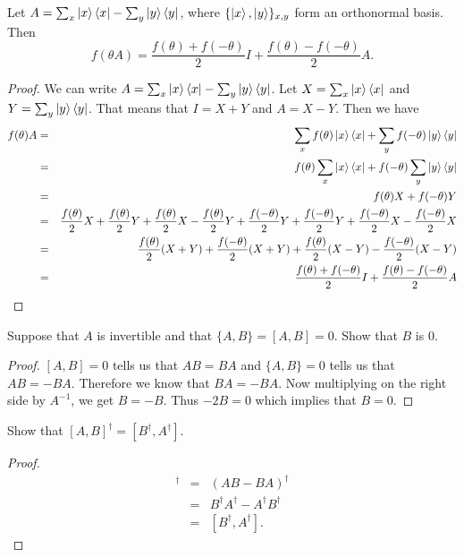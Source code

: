 \documentclass{article}
\begin{document}
\begin{lemma}
  Let $A=\sum_x\ket{x}\bra{x}-\sum_y\ket{y}\bra{y}$, where $\{\ket{x},\ket{y}\}_{x,y}$ form an orthonormal basis.
  Then
  \[
    f(\theta A) = \frac{f(\theta)+f(-\theta)}{2}I + \frac{f(\theta)-f(-\theta)}{2}A.
  \]
  \begin{proof}
    We can write $A=\sum_x\ket{x}\bra{x}-\sum_y\ket{y}\bra{y}$.
    Let $X=\sum_x \ket{x}\bra{x}$ and
    $Y=\sum_y \ket{y}\bra{y}$. That means that
    $I=X+Y$ and $A=X-Y$. Then we have
    \begin{eqnarray*}
      f(\theta)A&=&\sum_xf(\theta)\ket{x}\bra{x}+\sum_yf(-\theta)\ket{y}\bra{y} \\
      &=&f(\theta)\sum_x\ket{x}\bra{x}+f(-\theta)\sum_y\ket{y}\bra{y} \\
      &=&f(\theta)X+f(-\theta)Y \\
      &=&\frac{f(\theta)}{2}X+\frac{f(\theta)}{2}Y+\frac{f(\theta)}{2}X-\frac{f(\theta)}{2}Y+\frac{f(-\theta)}{2}Y+\frac{f(-\theta)}{2}Y+\frac{f(-\theta)}{2}X-\frac{f(-\theta)}{2}X \\
      &=&\frac{f(\theta)}{2}(X+Y)+\frac{f(-\theta)}{2}(X+Y)+\frac{f(\theta)}{2}(X-Y)-\frac{f(-\theta)}{2}(X-Y) \\
      &=&\frac{f(\theta)+f(-\theta)}{2}I+\frac{f(\theta)-f(-\theta)}{2}A
    \end{eqnarray*}
  \end{proof}
\end{lemma}
\setcounter{exercise}{43}

\begin{exercise}
  Suppose that $A$ is invertible and that $\{A,B\}=[A,B]=0$. Show that $B$ is 0.
  \begin{proof}
    $[A,B]=0$ tells us that $AB=BA$ and $\{A,B\}=0$ tells us that $AB=-BA$. Therefore we
    know that $BA=-BA$. Now multiplying on the right side by $A^{-1}$, we get $B=-B$. Thus
    $-2B=0$ which implies that $B=0$.
  \end{proof}
\end{exercise}

\begin{exercise}
  Show that $[A,B]^\dagger=[B^\dagger,A^\dagger]$.
  \begin{proof}
    \begin{eqnarray*}
      [A,B]^\dagger&=&\left(AB-BA\right)^\dagger \\
      &=&B^\dagger A^\dagger - A^\dagger B^\dagger \\
      &=&[B^\dagger,A^\dagger ].
    \end{eqnarray*}
  \end{proof}
\end{exercise}
\end{document}
